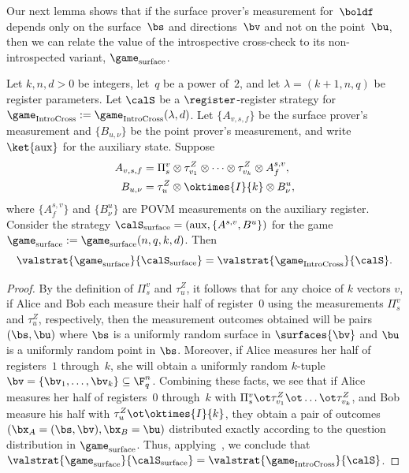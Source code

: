 Our next lemma shows that if the surface prover's measurement for~$\boldf$ depends only on the surface~$\bs$ and directions~$\bv$
and not on the point~$\bu$, then we can relate the value of the introspective
cross-check to its non-introspected variant, $\game_{\mathrm{surface}}$.
\begin{lemma}\label{lem:big-cross-check}
Let $k, n, d>0$ be integers, let~$q$ be a power of~$2$,
and let $\lambda = (k+1, n, q)$ be register parameters.
Let $\calS$ be a $\register$-register strategy for $\game_{\mathrm{IntroCross}} := \game_{\mathrm{IntroCross}}(\lambda, d)$.
Let $\{A_{v, s, f}\}$ be the surface prover's measurement
and $\{B_{u, \nu}\}$ be the point prover's measurement,
and write $\ket{\mathrm{aux}}$ for the auxiliary state.
Suppose
\begin{align*}
A_{ v,s, f} &= \Pi^{v}_s \otimes \tau_{v_1}^Z \otimes \dots \otimes
\tau_{v_k}^Z \otimes A^{s,v}_f,\\
B_{u, \nu} &= \tau_u^Z \otimes \oktimes{I}{k} \otimes B^u_\nu,
\end{align*}
where $\{A^{s, v}_f\}$ and $\{B^u_\nu\}$ are POVM measurements on the auxiliary register.
Consider the strategy $\calS_{\mathrm{surface}} = (\mathrm{aux}, \{A^{s, v}, B^u\})$ for the game $\game_{\mathrm{surface}}  := \game_{\mathrm{surface}}(n, q, k, d)$.
Then
\begin{equation*}
\valstrat{\game_{\mathrm{surface}}}{\calS_{\mathrm{surface}}}
= \valstrat{\game_{\mathrm{IntroCross}}}{\calS}.
\end{equation*}
\end{lemma}
\begin{proof}
  By the definition of $\Pi^{v}_s$ and $\tau^Z_u$, it follows that for
  any choice of $k$ vectors $v$, if
  Alice and Bob each measure their half of register~$0$
  using the measurements $\Pi^v_s$ and $\tau^Z_u$, respectively, then
  the measurement outcomes obtained will be pairs $(\bs, \bu)$ where $\bs$
  is a uniformly random surface in $\surfaces{\bv}$ and $\bu$ is a uniformly
  random point in $\bs$. Moreover, if Alice measures her half of registers~$1$ through~$k$,
  she will obtain a uniformly random $k$-tuple $\bv = \{\bv_1,
  \dots, \bv_k\} \subseteq \F_q^n$. Combining these facts, we see that
  if Alice measures her half of registers~$0$ through~$k$ with
  $\Pi^v_s \ot \tau^Z_{v_1} \ot \dots \ot \tau^Z_{v_k}$, and Bob
  measure his half with $\tau^Z_u \ot \oktimes{I}{k}$, they obtain a
  pair of outcomes $(\bx_A = (\bs, \bv), \bx_B = \bu)$ distributed exactly
  according to the question distribution in
  $\game_{\mathrm{surface}}$. Thus, applying~, we conclude
that $\valstrat{\game_{\mathrm{surface}}}{\calS_{\mathrm{surface}}} = \valstrat{\game_{\mathrm{IntroCross}}}{\calS}$.
\end{proof}

